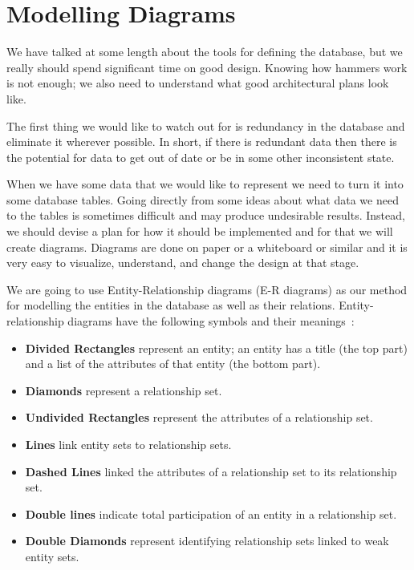 




\section*{Modelling Diagrams}

We have talked at some length about the tools for defining the database, but we really should spend significant time on good design. Knowing how hammers work is not enough; we also need to understand what good architectural plans look like.

The first thing we would like to watch out for is redundancy in the database and eliminate it wherever possible. In short, if there is redundant data then there is the potential for data to get out of date or be in some other inconsistent state. 

When we have some data that we would like to represent we need to turn it into some database tables. Going directly from some ideas about what data we need to the tables is sometimes difficult and may produce undesirable results. Instead, we should devise a plan for how it should be implemented and for that we will create diagrams. Diagrams are done on paper or a whiteboard or similar and it is very easy to visualize, understand, and change the design at that stage.

We are going to use Entity-Relationship diagrams (E-R diagrams) as our method for modelling the entities in the database as well as their relations. Entity-relationship diagrams have the following symbols and their meanings~\cite{dsc}:

\begin{itemize}
	\item \textbf{Divided Rectangles} represent an entity; an entity has a title (the top part) and a list of the attributes of that entity (the bottom part).
	\item \textbf{Diamonds} represent a relationship set.
	\item \textbf{Undivided Rectangles} represent the attributes of a relationship set. 
	\item \textbf{Lines} link entity sets to relationship sets.
	\item \textbf{Dashed Lines} linked the attributes of a relationship set to its relationship set.
	\item \textbf{Double lines} indicate total participation of an entity in a relationship set.
	\item \textbf{Double Diamonds} represent identifying relationship sets linked to weak entity sets.
\end{itemize}

